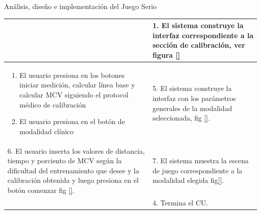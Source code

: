 \begin{thesischapter}{2} {Análisis, diseño e implementación del Juego Serio}
\begin{center}
\begin{table}
\begin{tabularx}{\textwidth}{|X|X|}
                & 
                1. El sistema construye la interfaz correspondiente a la sección de calibración, ver figura \ref{} \\\hline
                \begin{enumerate}
                    \item[2.] El usuario presiona en los botones iniciar medición, calcular línea base y calcular MCV siguiendo el protocol médico de calibración
                    \item[3.] El usuario presiona en el botón de modalidad clínico
                \end{enumerate}
                &
                5. El sistema construye la interfaz con los parámetros generales de la modalidad seleccionada, fig \ref{}. \\\hline
                6. El usuario inserta los valores de distancia, tiempo y porciento de MCV según la dificultad del entrenamiento que desee y la calibración obtenida y luego presiona en el botón comenzar fig \ref{}. 
                & 
                7. El sistema muestra la escena de juego correspondiente a la modalidad elegida fig\ref{}. \\ &4. Termina el CU. \\\hline
                

                
                



\end{tabularx}
\end{table}
\end{center}
\end{thesischapter}
